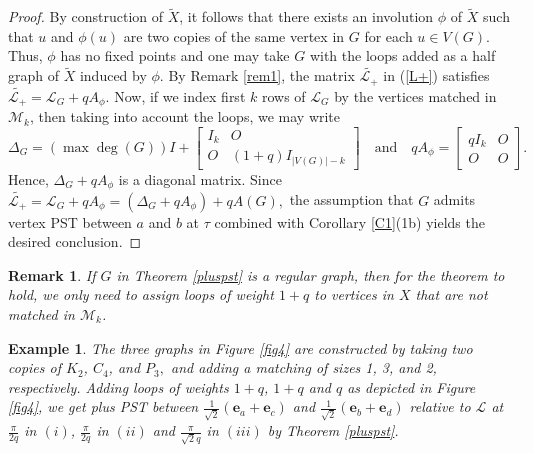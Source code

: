 \documentclass[12pt,a4paper]{article}
\newtheorem{exm}{Example}
\newtheorem{rem}{Remark}
\def \e {{\mathbf e}}
\begin{document}
\begin{proof}
By construction of $\widetilde{X}$, it follows that there exists an involution $\phi$ of $\widetilde{X}$ such that $u$ and $\phi(u)$ are two copies of the same vertex in $G$ for each $u\in V(G)$. Thus, $\phi$ has no fixed points and one may take $G$ with the loops added as a half graph of $\widetilde{X}$ induced by $\phi$. By Remark \ref{rem1}, the matrix $\widetilde{\mathscr{L}_+}$ in (\ref{L+}) satisfies $\widetilde{\mathscr{L}_+}=\mathscr{L}_G+qA_\phi$. Now, if we index first $k$ rows of $\mathscr{L}_G$ by the vertices matched in $\mathcal{M}_k$, then taking into account the loops, we may write
\begin{equation*}
\Delta_G=(\max\operatorname{deg}(G))I+\begin{bmatrix}I_k & O\\O & (1+q)I_{|V(G)|-k}\end{bmatrix}\quad \text{and}\quad qA_\phi=\begin{bmatrix}	qI_k & O\\	O & O
\end{bmatrix}.
\end{equation*}
Hence, $\Delta_G+qA_\phi$ is a diagonal matrix. Since $\widetilde{\mathscr{L}_+}=\mathscr{L}_G+qA_\phi=(\Delta_G+qA_\phi)+qA(G),$ the assumption that $G$ admits vertex PST between $a$ and $b$ at $\tau$ combined with Corollary \ref{C1}(1b) yields the desired conclusion.
\end{proof}

\begin{rem}
If $G$ in Theorem \ref{pluspst} is a regular graph, then for the theorem to hold, we only need to assign loops of weight $1+q$ to vertices in $X$ that are not matched in $\mathcal{M}_k$.
\end{rem}

\begin{exm}
The three graphs in Figure \ref{fig4} are constructed by taking two copies of $K_2$, $C_4$, and $P_3,$ and adding a matching of sizes 1, 3, and 2, respectively. Adding loops of weights $1+q$, $1+q$ and $q$ as depicted in Figure \ref{fig4}, we get plus PST between $\frac{1}{\sqrt{2}}(\e_a+\e_c)$ and $\frac{1}{\sqrt{2}}(\e_b+\e_d)$ relative to $\mathscr{L}$ at $\frac{\pi}{2q}$ in $(i)$, $\frac{\pi}{2q}$ in $(ii)$ and $\frac{\pi}{\sqrt{2}q}$ in $(iii)$ by Theorem \ref{pluspst}.
\end{exm}
\end{document}
